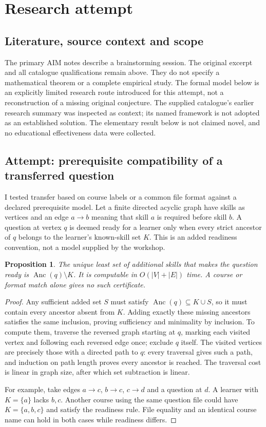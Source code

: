 \documentclass[11pt]{article}
\newtheorem{proposition}{Proposition}
\begin{document}
\section{Research attempt}
\subsection{Literature, source context and scope}
The primary AIM notes describe a brainstorming session. The original excerpt and all catalogue qualifications remain above. They do not specify a mathematical theorem or a complete empirical study. The formal model below is an explicitly limited research route introduced for this attempt, not a reconstruction of a missing original conjecture. The supplied catalogue's earlier research summary was inspected as context; its named framework is not adopted as an established solution. The elementary result below is not claimed novel, and no educational effectiveness data were collected.

\subsection{Attempt: prerequisite compatibility of a transferred question}
I tested transfer based on course labels or a common file format against a declared prerequisite model. Let a finite directed acyclic graph have skills as vertices and an edge $a\to b$ meaning that skill $a$ is required before skill $b$. A question at vertex $q$ is deemed ready for a learner only when every strict ancestor of $q$ belongs to the learner's known-skill set $K$. This is an added readiness convention, not a model supplied by the workshop.
\begin{proposition}
The unique least set of additional skills that makes the question ready is $\operatorname{Anc}(q)\setminus K$. It is computable in $O(|V|+|E|)$ time. A course or format match alone gives no such certificate.
\end{proposition}
\begin{proof}
Any sufficient added set $S$ must satisfy $\operatorname{Anc}(q)\subseteq K\cup S$, so it must contain every ancestor absent from $K$. Adding exactly these missing ancestors satisfies the same inclusion, proving sufficiency and minimality by inclusion. To compute them, traverse the reversed graph starting at $q$, marking each visited vertex and following each reversed edge once; exclude $q$ itself. The visited vertices are precisely those with a directed path to $q$: every traversal gives such a path, and induction on path length proves every ancestor is reached. The traversal cost is linear in graph size, after which set subtraction is linear.

For example, take edges $a\to c$, $b\to c$, $c\to d$ and a question at $d$. A learner with $K=\{a\}$ lacks $b,c$. Another course using the same question file could have $K=\{a,b,c\}$ and satisfy the readiness rule. File equality and an identical course name can hold in both cases while readiness differs.
\end{proof}
\end{document}
